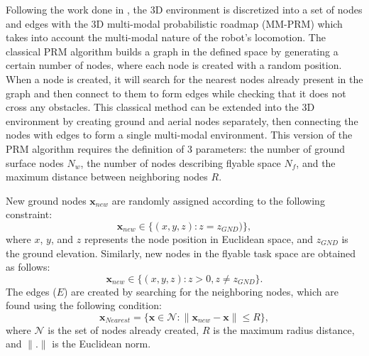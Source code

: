 \documentclass[letterpaper, 10 pt, conference]{ieeeconf}  %
\newcommand{\milad}[1]{{\color{red}#1}}
\begin{document}
{%
Following the work done in \cite{sihite2022efficient, MM_PRM}, the 3D environment is discretized into a set of nodes and edges with the 3D multi-modal probabilistic roadmap (MM-PRM) which takes into account the multi-modal nature of the robot's locomotion. The classical PRM algorithm builds a graph in the defined space by generating a certain number of nodes, where each node is created with a random position. When a node is created, it will search for the nearest nodes already present in the graph and then connect to them to form edges while checking that it does not cross any obstacles. This classical method can be extended into the 3D environment by creating ground and aerial nodes separately, then connecting the nodes with edges to form a single multi-modal environment. This version of the PRM algorithm requires the definition of 3 parameters: the number of ground surface nodes $N_w$, the number of nodes describing flyable space $N_f$, and the maximum distance between neighboring nodes $R$.

New ground nodes $\mathbf x_{new}$ are randomly assigned according to the following constraint:
%
\begin{equation}
\mathbf x_{new} \in \{(x, y, z): z=z_{GND})\},
\end{equation}
%
\noindent where $x$, $y$, and $z$ represents the node position in Euclidean space, and $z_{GND}$ is the ground elevation. Similarly, new nodes in the flyable task space are obtained as follows:
%
\begin{equation}
\mathbf x_{new} \in \{ (x, y, z): z > 0, z \ne z_{GND} \}.
\end{equation}
%
The edges ($E$) are created by searching for the neighboring nodes, which are found using the following condition:
%
\begin{equation}
    \mathbf x_{Nearest} = \{\mathbf x \in \mathcal{N} : \| \mathbf x_{new} - \mathbf x \| \leq R\},
\end{equation}
%
\noindent where $\mathcal{N}$ is the set of nodes already created, $R$ is the maximum radius distance, and $\| . \|$ is the Euclidean norm. 




}
\end{document}
